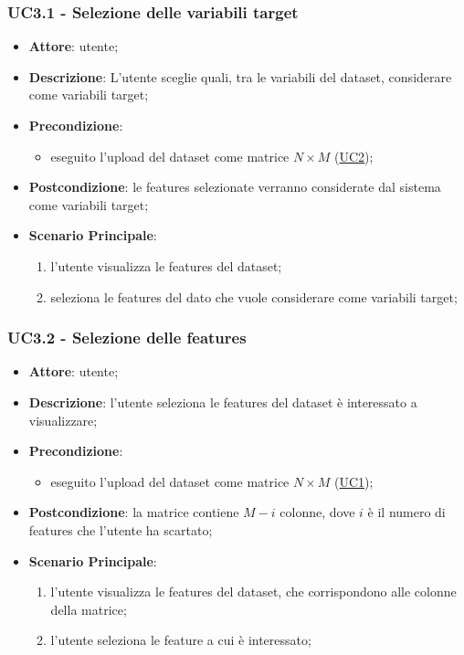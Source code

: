     \subsubsection{UC3.1 - Selezione delle variabili target}
    \label{uc3.1}
    \begin{itemize}
    \item \textbf{Attore}: utente;
    \item \textbf{Descrizione}: L'utente sceglie quali, tra le variabili del dataset, considerare come variabili target;
    \item \textbf{Precondizione}:
    \begin{itemize}
        \item eseguito l'upload del dataset come matrice $N\times M$ (\hyperref[uc2]{UC2});
    \end{itemize}
    \item \textbf{Postcondizione}: le features selezionate verranno considerate dal sistema come variabili target;
    \item \textbf{Scenario Principale}: 
    \begin{enumerate}
        \item l'utente visualizza le features del dataset;
        \item seleziona le features del dato che vuole considerare come variabili target;
    \end{enumerate}  
    \end{itemize}
    
    \subsubsection{UC3.2 - Selezione delle features}
    \label{uc3.2}

    \begin{itemize}
    \item \textbf{Attore}: utente;
    \item \textbf{Descrizione}: l'utente seleziona le features del dataset è interessato a visualizzare;
    \item \textbf{Precondizione}: 
     \begin{itemize}
        \item eseguito l'upload del dataset come matrice $N\times M$ (\hyperref[uc1]{UC1});
    \end{itemize}
    \item \textbf{Postcondizione}: la matrice contiene $M-i$ colonne, dove $i$ è il numero di features che l'utente ha scartato;
    \item \textbf{Scenario Principale}: 
    \begin{enumerate}
        \item l'utente visualizza le features del dataset, che corrispondono alle colonne della matrice;
        \item l'utente seleziona le feature a cui è interessato;
    \end{enumerate}
    \end{itemize}
    

